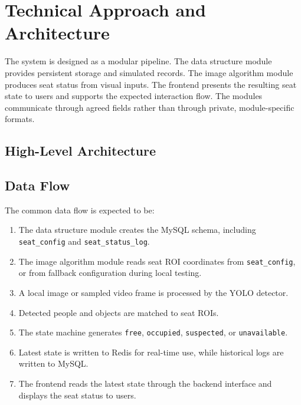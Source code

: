 \section{Technical Approach and Architecture}

The system is designed as a modular pipeline. The data structure module provides persistent storage and simulated records. The image algorithm module produces seat status from visual inputs. The frontend presents the resulting seat state to users and supports the expected interaction flow. The modules communicate through agreed fields rather than through private, module-specific formats.

\subsection{High-Level Architecture}

\begin{center}
\end{center}

\subsection{Data Flow}

The common data flow is expected to be:

\begin{enumerate}
  \item The data structure module creates the MySQL schema, including \texttt{seat\_config} and \texttt{seat\_status\_log}.
  \item The image algorithm module reads seat ROI coordinates from \texttt{seat\_config}, or from fallback configuration during local testing.
  \item A local image or sampled video frame is processed by the YOLO detector.
  \item Detected people and objects are matched to seat ROIs.
  \item The state machine generates \texttt{free}, \texttt{occupied}, \texttt{suspected}, or \texttt{unavailable}.
  \item Latest state is written to Redis for real-time use, while historical logs are written to MySQL.
  \item The frontend reads the latest state through the backend interface and displays the seat status to users.
\end{enumerate}

